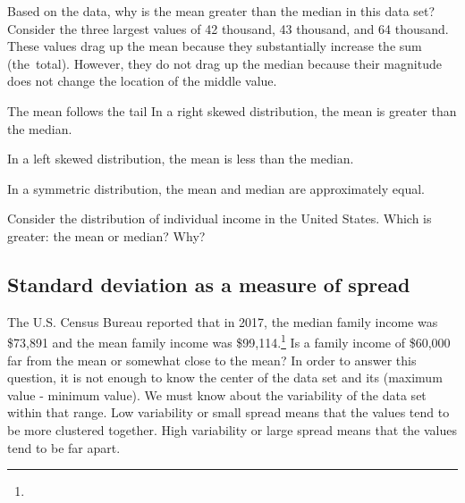 \begin{examplewrap}
\begin{nexample}{Based on the data, why is the mean greater than the median in this data set?}
Consider the three largest values of 42 thousand, 43 thousand, and 64 thousand. These values drag up the mean because they substantially increase the sum (the~total). However, they do not drag up the median because their magnitude does not change the location of the middle value.
\end{nexample}
\end{examplewrap}


\begin{onebox}{The mean follows the tail}
In a right skewed distribution, the mean is greater than the median.

In a left skewed distribution, the mean is less than the median.

In a symmetric distribution, the mean and median are approximately equal.\end{onebox}

\begin{exercisewrap}
\begin{nexercise}Consider the distribution of individual income in the United States. Which is greater: the mean or median? Why?\footnotemark
\end{nexercise}
\end{exercisewrap}


\D{\newpage}

\subsection{Standard deviation as a measure of spread}
\label{variability}

The U.S. Census Bureau reported that in 2017, the median family income was \$73,891 and the mean family income was \$99,114.\footnote{} Is a family income of \$60,000 far from the mean or somewhat close to the mean? In order to answer this question, it is not enough to know the center of the data set and its  (maximum value - minimum value). We must know about the variability of the data set within that range. Low variability or small spread means that the values tend to be more clustered together. High variability or large spread means that the values tend to be far apart.

